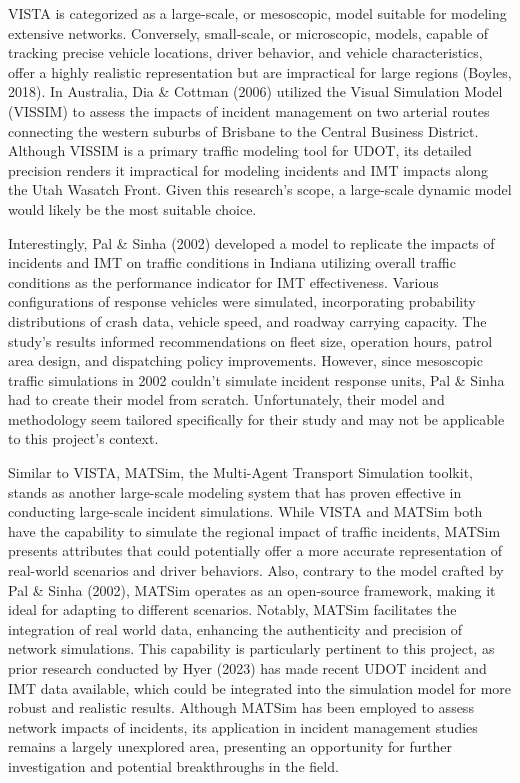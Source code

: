 \documentclass[fancy, oneside, mastersfancy, ms]{byuthesis}
\begin{document}
VISTA is categorized as a large-scale, or mesoscopic, model suitable for
modeling extensive networks. Conversely, small-scale, or microscopic,
models, capable of tracking precise vehicle locations, driver behavior,
and vehicle characteristics, offer a highly realistic representation but
are impractical for large regions (Boyles, 2018). In Australia, Dia \&
Cottman (2006) utilized the Visual Simulation Model (VISSIM) to assess
the impacts of incident management on two arterial routes connecting the
western suburbs of Brisbane to the Central Business District. Although
VISSIM is a primary traffic modeling tool for UDOT, its detailed
precision renders it impractical for modeling incidents and IMT impacts
along the Utah Wasatch Front. Given this research's scope, a large-scale
dynamic model would likely be the most suitable choice.

Interestingly, Pal \& Sinha (2002) developed a model to replicate the
impacts of incidents and IMT on traffic conditions in Indiana utilizing
overall traffic conditions as the performance indicator for IMT
effectiveness. Various configurations of response vehicles were
simulated, incorporating probability distributions of crash data,
vehicle speed, and roadway carrying capacity. The study's results
informed recommendations on fleet size, operation hours, patrol area
design, and dispatching policy improvements. However, since mesoscopic
traffic simulations in 2002 couldn't simulate incident response units,
Pal \& Sinha had to create their model from scratch. Unfortunately,
their model and methodology seem tailored specifically for their study
and may not be applicable to this project's context.

Similar to VISTA, MATSim, the Multi-Agent Transport Simulation toolkit,
stands as another large-scale modeling system that has proven effective
in conducting large-scale incident simulations. While VISTA and MATSim
both have the capability to simulate the regional impact of traffic
incidents, MATSim presents attributes that could potentially offer a
more accurate representation of real-world scenarios and driver
behaviors. Also, contrary to the model crafted by Pal \& Sinha (2002),
MATSim operates as an open-source framework, making it ideal for
adapting to different scenarios. Notably, MATSim facilitates the
integration of real world data, enhancing the authenticity and precision
of network simulations. This capability is particularly pertinent to
this project, as prior research conducted by Hyer (2023) has made recent
UDOT incident and IMT data available, which could be integrated into the
simulation model for more robust and realistic results. Although MATSim
has been employed to assess network impacts of incidents, its
application in incident management studies remains a largely unexplored
area, presenting an opportunity for further investigation and potential
breakthroughs in the field.
\end{document}
